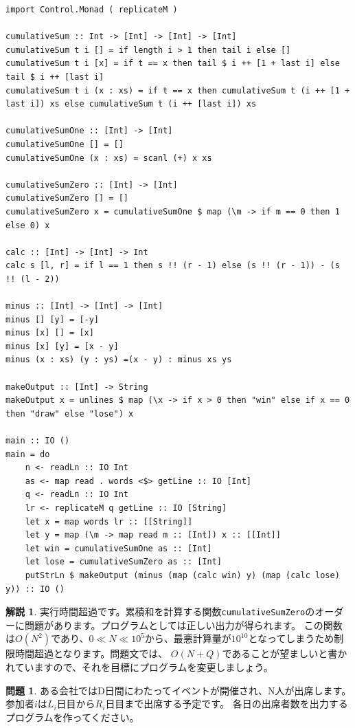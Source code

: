 \documentclass[12pt,a4paper,dvipdfmx,fleqn]{article}%
\theoremstyle{definition}
\newtheorem*{toi*}{問題}
\theoremstyle{definition}
\newtheorem*{ans*}{解説}
\theoremstyle{definition}
\newcommand{\ttt}[1]{\texttt{#1}} %
\begin{document}
\begin{lstlisting}[caption=B06.hs,label=B06]
import Control.Monad ( replicateM )

cumulativeSum :: Int -> [Int] -> [Int] -> [Int]
cumulativeSum t i [] = if length i > 1 then tail i else []
cumulativeSum t i [x] = if t == x then tail $ i ++ [1 + last i] else tail $ i ++ [last i]
cumulativeSum t i (x : xs) = if t == x then cumulativeSum t (i ++ [1 + last i]) xs else cumulativeSum t (i ++ [last i]) xs
    
cumulativeSumOne :: [Int] -> [Int]
cumulativeSumOne [] = []
cumulativeSumOne (x : xs) = scanl (+) x xs

cumulativeSumZero :: [Int] -> [Int]
cumulativeSumZero [] = []
cumulativeSumZero x = cumulativeSumOne $ map (\m -> if m == 0 then 1 else 0) x

calc :: [Int] -> [Int] -> Int
calc s [l, r] = if l == 1 then s !! (r - 1) else (s !! (r - 1)) - (s !! (l - 2))

minus :: [Int] -> [Int] -> [Int]
minus [] [y] = [-y]
minus [x] [] = [x]
minus [x] [y] = [x - y]
minus (x : xs) (y : ys) =(x - y) : minus xs ys

makeOutput :: [Int] -> String
makeOutput x = unlines $ map (\x -> if x > 0 then "win" else if x == 0 then "draw" else "lose") x

main :: IO ()
main = do
    n <- readLn :: IO Int
    as <- map read . words <$> getLine :: IO [Int]
    q <- readLn :: IO Int
    lr <- replicateM q getLine :: IO [String]
    let x = map words lr :: [[String]]
    let y = map (\m -> map read m :: [Int]) x :: [[Int]]
    let win = cumulativeSumOne as :: [Int]
    let lose = cumulativeSumZero as :: [Int]
    putStrLn $ makeOutput (minus (map (calc win) y) (map (calc lose) y)) :: IO ()
\end{lstlisting}
\begin{ans*}
    実行時間超過です。累積和を計算する関数\ttt{cumulativeSumZero}のオーダーに問題があります。プログラムとしては正しい出力が得られます。
    この関数は$O(N^2)$であり、$0\ll N\ll 10^5$から、最悪計算量が$10^{10}$となってしまうため制限時間超過となります。問題文では、
    $O(N+Q)$であることが望ましいと書かれていますので、それを目標にプログラムを変更しましょう。
\end{ans*}
\begin{toi*}
    ある会社ではD日間にわたってイベントが開催され、N人が出席します。参加者$i$は$L_i$日目から$R_i$日目まで出席する予定です。
    各日の出席者数を出力するプログラムを作ってください。
\end{toi*}
\end{document}
